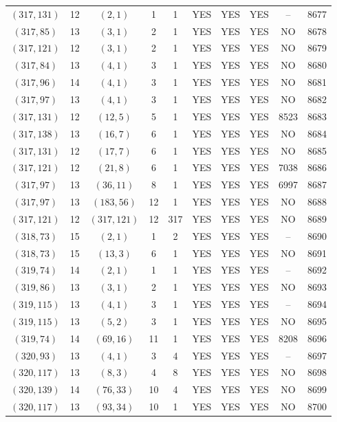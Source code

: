 \begin{longtable}{|c|c|c|c|c|c|c|c|c|c|}
$(317, 131)$ & 12 & $(2, 1)$ & 1 & 1 & YES & YES & YES & -- & 8677\\
$(317, 85)$ & 13 & $(3, 1)$ & 2 & 1 & YES & YES & YES & NO & 8678\\
$(317, 121)$ & 12 & $(3, 1)$ & 2 & 1 & YES & YES & YES & NO & 8679\\
$(317, 84)$ & 13 & $(4, 1)$ & 3 & 1 & YES & YES & YES & NO & 8680\\
$(317, 96)$ & 14 & $(4, 1)$ & 3 & 1 & YES & YES & YES & NO & 8681\\
$(317, 97)$ & 13 & $(4, 1)$ & 3 & 1 & YES & YES & YES & NO & 8682\\
$(317, 131)$ & 12 & $(12, 5)$ & 5 & 1 & YES & YES & YES & 8523 & 8683\\
$(317, 138)$ & 13 & $(16, 7)$ & 6 & 1 & YES & YES & YES & NO & 8684\\
$(317, 131)$ & 12 & $(17, 7)$ & 6 & 1 & YES & YES & YES & NO & 8685\\
$(317, 121)$ & 12 & $(21, 8)$ & 6 & 1 & YES & YES & YES & 7038 & 8686\\
$(317, 97)$ & 13 & $(36, 11)$ & 8 & 1 & YES & YES & YES & 6997 & 8687\\
$(317, 97)$ & 13 & $(183, 56)$ & 12 & 1 & YES & YES & YES & NO & 8688\\
$(317, 121)$ & 12 & $(317, 121)$ & 12 & 317 & YES & YES & YES & NO & 8689\\
$(318, 73)$ & 15 & $(2, 1)$ & 1 & 2 & YES & YES & YES & -- & 8690\\
$(318, 73)$ & 15 & $(13, 3)$ & 6 & 1 & YES & YES & YES & NO & 8691\\
$(319, 74)$ & 14 & $(2, 1)$ & 1 & 1 & YES & YES & YES & -- & 8692\\
$(319, 86)$ & 13 & $(3, 1)$ & 2 & 1 & YES & YES & YES & NO & 8693\\
$(319, 115)$ & 13 & $(4, 1)$ & 3 & 1 & YES & YES & YES & -- & 8694\\
$(319, 115)$ & 13 & $(5, 2)$ & 3 & 1 & YES & YES & YES & NO & 8695\\
$(319, 74)$ & 14 & $(69, 16)$ & 11 & 1 & YES & YES & YES & 8208 & 8696\\
$(320, 93)$ & 13 & $(4, 1)$ & 3 & 4 & YES & YES & YES & -- & 8697\\
$(320, 117)$ & 13 & $(8, 3)$ & 4 & 8 & YES & YES & YES & NO & 8698\\
$(320, 139)$ & 14 & $(76, 33)$ & 10 & 4 & YES & YES & YES & NO & 8699\\
$(320, 117)$ & 13 & $(93, 34)$ & 10 & 1 & YES & YES & YES & NO & 8700\\

\end{longtable}
